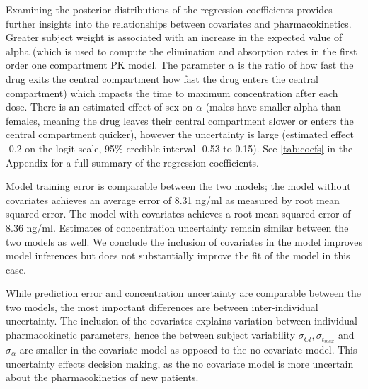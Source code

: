 Examining the posterior distributions of the regression coefficients provides further insights into the relationships between covariates and pharmacokinetics. Greater subject weight is associated with an increase in the expected value of alpha (which is used to compute the elimination and absorption rates in the first order one compartment PK model.  The parameter $ \alpha $ is the ratio of how fast the drug exits the central compartment  how fast the drug enters the central compartment) which impacts the time to maximum concentration after each dose.  There is an estimated effect of sex on $ \alpha $ (males have smaller alpha than females, meaning the drug leaves their central compartment slower or enters the central compartment quicker), however the uncertainty is large (estimated effect -0.2 on the logit scale, 95\% credible interval -0.53 to 0.15). See \cref{tab:coefs} in the Appendix for a full summary of the regression coefficients.




Model training error is comparable between the two models; the model without covariates achieves an average error of 8.31 ng/ml as measured by root mean squared error.  The model with covariates achieves a root mean squared error of 8.36  ng/ml.  Estimates of concentration uncertainty remain similar between the two models as well.  We conclude the inclusion of covariates in the model improves model inferences but does not substantially improve the fit of the model in this case.

While prediction error and concentration uncertainty are comparable between the two models, the most important differences are between inter-individual uncertainty.  The inclusion of the covariates explains variation between individual pharmacokinetic parameters, hence the between subject variability $\sigma_{Cl}, \sigma_{t_{max}}$ and $\sigma_\alpha$ are smaller in the covariate model as opposed to the no covariate model.  This uncertainty effects decision making, as the no covariate model is more uncertain about the pharmacokinetics of new patients.